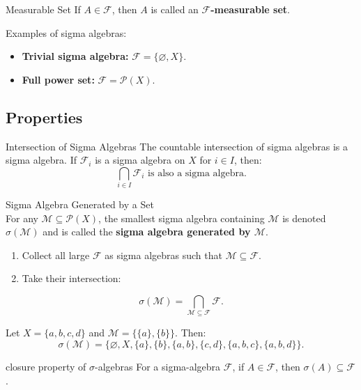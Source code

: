 \begin{df}{Measurable Set}
If \(A \in \mathscr{F}\), then \(A\) is called an \textbf{\(\mathscr{F}\)-measurable set}.
\end{df}

\begin{rmk}
Examples of sigma algebras:
\begin{itemize}
    \item \textbf{Trivial sigma algebra:} \(\mathscr{F} = \{\varnothing, X\}\).
    \item \textbf{Full power set:} \(\mathscr{F} = \mathscr{P}(X)\).
\end{itemize}
\end{rmk}



\subsection{Properties}
\begin{prop}{Intersection of Sigma Algebras}
The countable intersection of sigma algebras is a sigma algebra. If \(\mathscr{F}_i\) is a sigma algebra on \(X\) for \(i \in I\), then:
\[
\bigcap_{i \in I} \mathscr{F}_i \text{ is also a sigma algebra.}
\]
\end{prop}

\begin{df}{Sigma Algebra Generated by a Set}\\
For any \(\mathcal{M} \subseteq \mathscr{P}(X)\), the smallest sigma algebra containing \(\mathcal{M}\) is denoted \(\sigma(\mathcal{M})\) and is called the \textbf{sigma algebra generated by \(\mathcal{M}\)}.
\begin{enumerate}
    \item Collect all large \(\mathscr{F}\) as sigma algebras such that \(\mathcal{M} \subseteq \mathscr{F}\).
    \item Take their intersection:
\end{enumerate}
    \[
    \sigma(\mathcal{M}) = \bigcap_{\mathcal{M} \subseteq \mathscr{F}} \mathscr{F}.
    \]
\end{df}

\begin{eg}{}
Let \(X = \{a, b, c, d\}\) and \(\mathcal{M} = \{\{a\}, \{b\}\}\). Then:
\[
\sigma(\mathcal{M}) = \{\varnothing, X, \{a\}, \{b\}, \{a, b\}, \{c, d\}, \{a, b, c\}, \{a, b, d\}\}.
\]
\end{eg}

\begin{thm}{closure property of $\sigma$-algebras}
	For a sigma-algebra $\mathscr{F}$, if \( A \in \mathscr{F} \), then \(\sigma(A) \subseteq \mathscr{F}\).	
\end{thm}




